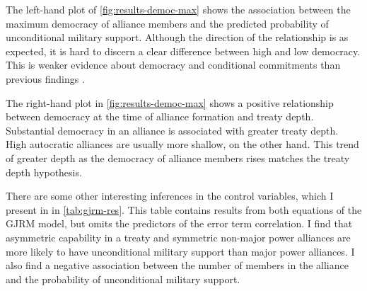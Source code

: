 \documentclass[12pt]{article}
\begin{document}
The left-hand plot of \autoref{fig:results-democ-max} shows the association between the maximum democracy of alliance members and the predicted probability of unconditional military support. 
Although the direction of the relationship is as expected, it is hard to discern a clear difference between high and low democracy. 
This is weaker evidence about democracy and conditional commitments than previous findings \citep{Mattes2012, Chibaetal2015}.


The right-hand plot in \autoref{fig:results-democ-max} shows a positive relationship between democracy at the time of alliance formation and treaty depth. 
Substantial democracy in an alliance is associated with greater treaty depth. 
High autocratic alliances are usually more shallow, on the other hand. 
This trend of greater depth as the democracy of alliance members rises matches the treaty depth hypothesis. 


There are some other interesting inferences in the control variables, which I present in in \autoref{tab:gjrm-res}. 
This table contains results from both equations of the GJRM model, but omits the predictors of the error term correlation. 
I find that asymmetric capability in a treaty and symmetric non-major power alliances are more likely to have unconditional military support than major power alliances. 
I also find a negative association between the number of members in the alliance and the probability of unconditional military support. 
\end{document}
